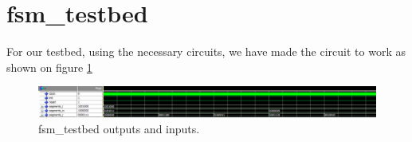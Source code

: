 \documentclass[10pt]{article}
\begin{document}
\section{fsm\_testbed}
For our testbed, using the necessary circuits, we have made the circuit to work as shown on figure \ref{fig:fsm_testbed}
\begin{figure}[!htb]
    \centering
    \includegraphics[width=1\textwidth]{./fsm_testbed.png}
    \caption{fsm\_testbed outputs and inputs.}
    \label{fig:fsm_testbed}
\end{figure}
\end{document}
